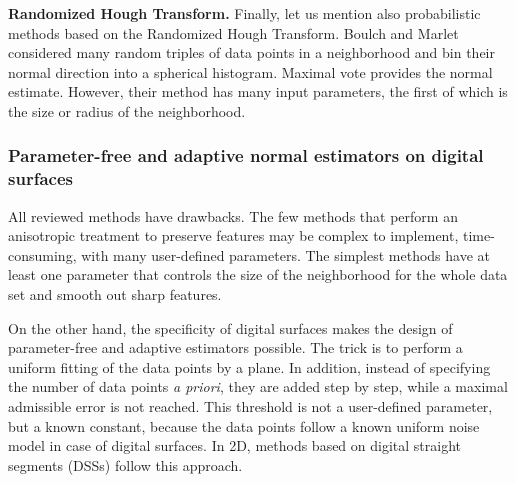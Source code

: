 
\noindent\textbf{Randomized Hough Transform.}
Finally, let us mention also probabilistic methods based on the Randomized Hough Transform.
Boulch and Marlet \cite{Boulch2012} considered many random triples of data points in a neighborhood
and bin their normal direction into a spherical histogram.
Maximal vote provides the normal estimate. However, their method has many input parameters,
the first of which is the size or radius of the neighborhood. 


\subsubsection{Parameter-free and adaptive normal estimators on digital surfaces}
\label{sec:estim:ds}

All reviewed methods have drawbacks. The few methods that perform an anisotropic
treatment to preserve features may be complex to implement, time-consuming, with
many user-defined parameters. The simplest methods have at least one parameter
that controls the size of the neighborhood for the whole data set and smooth out
sharp features.  

On the other hand, the specificity of digital surfaces makes the design of parameter-free
and adaptive estimators possible. The trick is to perform a uniform fitting of the data points by a plane.
In addition, instead of specifying the number of data points \emph{a priori}, they are added
step by step, while a maximal admissible error is not reached. This threshold is not a user-defined
parameter, but a known constant, because the data points follow a known uniform noise model
in case of digital surfaces. In 2D, methods based on digital straight segments (DSSs) follow
this approach.

